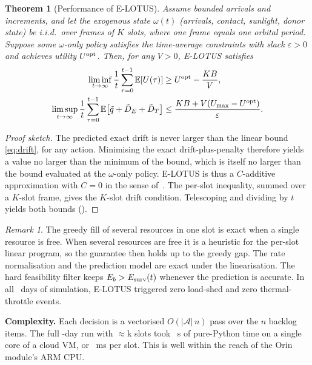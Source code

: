 \documentclass[conference]{IEEEtran}
\newtheorem{theorem}{Theorem}
\theoremstyle{remark}
\newtheorem{remark}{Remark}
\begin{document}
\begin{theorem}[Performance of E-LOTUS]\label{thm:dpp}
Assume bounded arrivals and increments, and let the exogenous state $\omega(t)$ (arrivals, contact, sunlight, donor state) be i.i.d.\ over frames of $K$ slots, where one frame equals one orbital period. Suppose some $\omega$-only policy satisfies the time-average constraints with slack $\varepsilon>0$ and achieves utility $U^{\rm opt}$. Then, for any $V>0$, E-LOTUS satisfies
\begin{align}
\liminf_{t\to\infty}\frac1t\sum_{\tau=0}^{t-1}\mathbb E[U(\tau)]&\ge U^{\rm opt}-\frac{KB}{V},\\
\limsup_{t\to\infty}\frac1t\sum_{\tau=0}^{t-1}\mathbb E\big[\tilde q+\tilde D_E+\tilde D_T\big]&\le\frac{KB+V(U_{\max}-U^{\rm opt})}{\varepsilon}.
\end{align}
\end{theorem}
\begin{proof}[Proof sketch]
The predicted exact drift is never larger than the linear bound \eqref{eq:drift}, for any action. Minimising the exact drift-plus-penalty therefore yields a value no larger than the minimum of the bound, which is itself no larger than the bound evaluated at the $\omega$-only policy. E-LOTUS is thus a $C$-additive approximation with $C=0$ in the sense of~\cite{neely2010stochastic}. The per-slot inequality, summed over a $K$-slot frame, gives the $K$-slot drift condition. Telescoping and dividing by $t$ yields both bounds (\cite[Thm.~4.8 and Sec.~4.9]{neely2010stochastic}).
\end{proof}

\begin{remark}
The greedy fill of several resources in one slot is exact when a single resource is free. When several resources are free it is a heuristic for the per-slot linear program, so the guarantee then holds up to the greedy gap. The rate normalisation and the prediction model are exact under the linearisation. The hard feasibility filter keeps $E_b>E_{\rm surv}(t)$ whenever the prediction is accurate. In all \Days\ days of simulation, E-LOTUS triggered zero load-shed and zero thermal-throttle events.
\end{remark}

\textbf{Complexity.} Each decision is a vectorised $O(|\mathcal A|\,n)$ pass over the $n$ backlog items. The full \Days-day run with $\approx$\SlotsK k slots took \ELruntime~s of pure-Python time on a single core of a cloud VM, or \ELmsPerSlot~ms per slot. This is well within the reach of the Orin module's ARM CPU.
\end{document}
